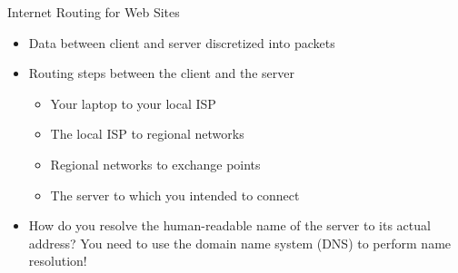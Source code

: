 \documentclass[14pt,aspectratio=169]{beamer}
\begin{document}
%
\begin{frame}{Internet Routing for Web Sites}
  \begin{itemize}
    \item Data between client and server discretized into packets
    \item Routing steps between the client and the server
      \begin{itemize}
        \item Your laptop to your local ISP
        \item The local ISP to regional networks
        \item Regional networks to exchange points
        \item The server to which you intended to connect
      \end{itemize}
      \vspace*{-.2in}
    \item How do you resolve the human-readable name of the server to its actual
      address? You need to use the domain name system (DNS) to perform name
      resolution!
  \end{itemize}
\end{frame}
\end{document}
